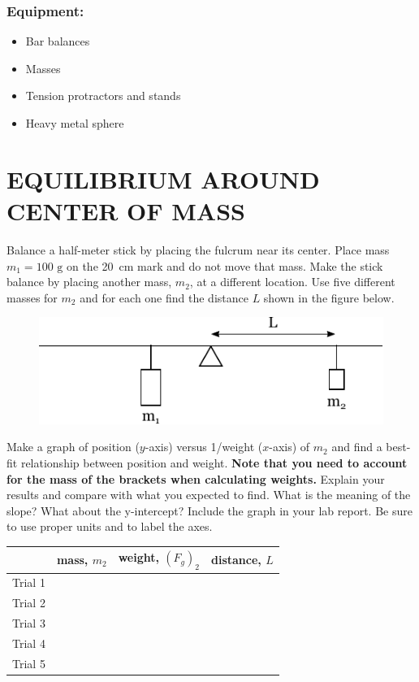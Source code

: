 \documentclass[11pt,letterpaper]{article}
\begin{document}
\subsubsection*{Equipment:}
\begin{itemize}
\setlength{\parskip}{3pt}
\item Bar balances
\item Masses
\item Tension protractors and stands
\item Heavy metal sphere
\end{itemize}

\section{EQUILIBRIUM AROUND CENTER OF MASS}
Balance a half-meter stick by placing the fulcrum near its center.  Place mass $m_1=100\mbox{ g}$ on the 20~cm mark and do not move that mass. Make the stick balance by placing another mass, $m_2$, at a different location. Use five different masses for $m_2$ and for each one find the distance $L$ shown in the figure below.

\begin{figure}[h]
\begin{center}
\includegraphics[]{./lab6_part1.pdf}
\end{center}
\end{figure}

Make a graph of position ($y$-axis) versus 1/weight ($x$-axis) of $m_2$ and find a best-fit relationship between position and weight. \textbf{Note that you need to account for the mass of the brackets when calculating weights.} Explain your results and compare with what you expected to find. What is the meaning of the slope? What about the y-intercept? Include the graph in your lab report. Be sure to use proper units and to label the axes.

\vspace{.5cm}

\renewcommand{\arraystretch}{1.4}
\begin{tabularx}{\linewidth}{|Y|Y|Y|Y|}
\hline
\vspace{2cm} & mass, $m_2$ & weight, $\left(F_g\right)_2$ & distance, $L$ \\
\hline Trial 1 &&&\\
\hline Trial 2 &&&\\
\hline Trial 3 &&&\\
\hline Trial 4 &&&\\
\hline Trial 5 &&&\\
\hline
\end{tabularx}\\
\end{document}
